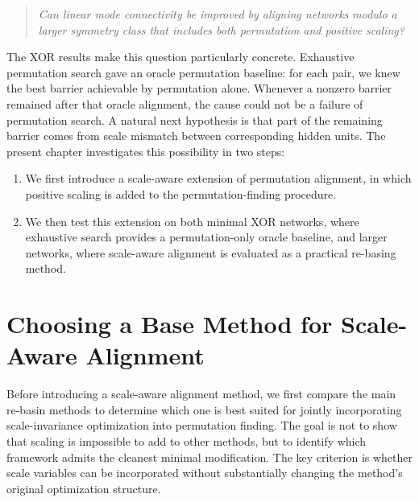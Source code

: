 \documentclass[11pt,a4paper]{report}
\begin{document}
\begin{quote}
\textit{Can linear mode connectivity be improved by aligning networks modulo a larger symmetry class that includes both permutation and positive scaling?}
\end{quote}

The XOR results make this question particularly concrete. Exhaustive permutation search gave an oracle permutation baseline: for each pair, we knew the best barrier achievable by permutation alone. Whenever a nonzero barrier remained after that oracle alignment, the cause could not be a failure of permutation search. A natural next hypothesis is that part of the remaining barrier comes from scale mismatch between corresponding hidden units.  The present chapter investigates this possibility in two steps:

\begin{enumerate}
    \item We first introduce a scale-aware extension of permutation alignment, in which positive scaling is added to the permutation-finding procedure.
    \item We then test this extension on both minimal XOR networks, where exhaustive search provides a permutation-only oracle baseline, and larger networks, where scale-aware alignment is evaluated as a practical re-basing method.
\end{enumerate}


\section{Choosing a Base Method for Scale-Aware Alignment}

Before introducing a scale-aware alignment method, we first compare the main re-basin methods to determine which one is best suited for jointly incorporating scale-invariance optimization into permutation finding. The goal is not to show that scaling is impossible to add to other methods, but to identify which framework admits the cleanest minimal modification. The key criterion is whether scale variables can be incorporated without substantially changing the method's original optimization structure.
\end{document}
